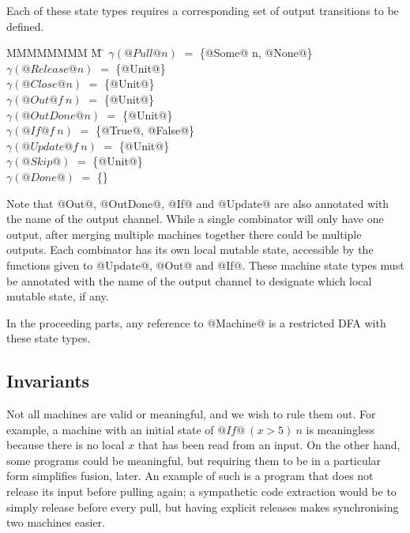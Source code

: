 Each of these state types requires a corresponding set of output transitions to be defined.
\begin{tabbing}
MMMMMMMM \= M \= \kill
$\gamma(@Pull @n)$
                            \> $=$ \> \{@Some@ n, @None@\} \\
$\gamma(@Release @n)$
                            \> $=$ \> \{@Unit@\} \\
$\gamma(@Close @n)$
                            \> $=$ \> \{@Unit@\} \\
$\gamma(@Out @   f~n)$
                            \> $=$ \> \{@Unit@\} \\
$\gamma(@OutDone @ n)$
                            \> $=$ \> \{@Unit@\} \\
$\gamma(@If @    f~n)$
                            \> $=$ \> \{@True@, @False@\} \\
$\gamma(@Update @f~n)$
                            \> $=$ \> \{@Unit@\} \\
$\gamma(@Skip@      )$
                            \> $=$ \> \{@Unit@\} \\
$\gamma(@Done@      )$
                            \> $=$ \> \{\} \\
\end{tabbing}

Note that @Out@, @OutDone@, @If@ and @Update@ are also annotated with the name of the output channel.
While a single combinator will only have one output, after merging multiple machines together there could be multiple outputs.
Each combinator has its own local mutable state, accessible by the functions given to @Update@, @Out@ and @If@.
These machine state types must be annotated with the name of the output channel to designate which local mutable state, if any.

In the proceeding parts, any reference to @Machine@ is a restricted DFA with these state types.

\subsection{Invariants}
\label{s:Machines:Invariants}
Not all machines are valid or meaningful, and we wish to rule them out.
For example, a machine with an initial state of $@If@~(x>5)~n$ is meaningless because there is no local $x$ that has been read from an input. 
On the other hand, some programs could be meaningful, but requiring them to be in a particular form simplifies fusion, later.
An example of such is a program that does not release its input before pulling again; a sympathetic code extraction would be to simply release before every pull, but having explicit releases makes synchronising two machines easier.

